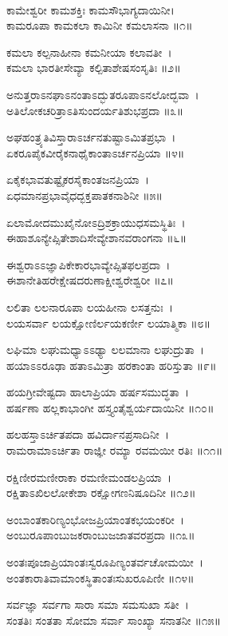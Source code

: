 \\
ಕಾಮೇಶ್ವರೀ ಕಾಮಶಕ್ತಿಃ ಕಾಮಸೌಭಾಗ್ಯದಾಯಿನೀ।\\
ಕಾಮರೂಪಾ ಕಾಮಕಲಾ ಕಾಮಿನೀ ಕಮಲಾಸನಾ ॥೧॥

ಕಮಲಾ ಕಲ್ಪನಾಹೀನಾ ಕಮನೀಯಾ ಕಲಾವತೀ~।\\
ಕಮಲಾ ಭಾರತೀಸೇವ್ಯಾ ಕಲ್ಪಿತಾಶೇಷಸಂಸೃತಿಃ ॥೨॥

ಅನುತ್ತರಾಽನಘಾಽನಂತಾಽದ್ಭುತರೂಪಾಽನಲೋದ್ಭವಾ~।\\
ಅತಿಲೋಕಚರಿತ್ರಾಽತಿಸುಂದರ್ಯತಿಶುಭಪ್ರದಾ ॥೩॥

ಅಘಹಂತ್ರ್ಯತಿವಿಸ್ತಾರಾಽರ್ಚನತುಷ್ಟಾಽಮಿತಪ್ರಭಾ~।\\
ಏಕರೂಪೈಕವೀರೈಕನಾಥೈಕಾಂತಾಽರ್ಚನಪ್ರಿಯಾ ॥೪॥

ಏಕೈಕಭಾವತುಷ್ಟೈಕರಸೈಕಾಂತಜನಪ್ರಿಯಾ~।\\
ಏಧಮಾನಪ್ರಭಾವೈಧದ್ಭಕ್ತಪಾತಕನಾಶಿನೀ ॥೫॥

ಏಲಾಮೋದಮುಖೈನೋಽದ್ರಿಶಕ್ರಾಯುಧಸಮಸ್ಥಿತಿಃ~।\\
ಈಹಾಶೂನ್ಯೇಪ್ಸಿತೇಶಾದಿಸೇವ್ಯೇಶಾನವರಾಂಗನಾ ॥೬॥

ಈಶ್ವರಾಽಽಜ್ಞಾಪಿಕೇಕಾರಭಾವ್ಯೇಪ್ಸಿತಫಲಪ್ರದಾ~।\\
ಈಶಾನೇತಿಹರೇಕ್ಷೇಷದರುಣಾಕ್ಷೀಶ್ವರೇಶ್ವರೀ ॥೭॥

ಲಲಿತಾ ಲಲನಾರೂಪಾ ಲಯಹೀನಾ ಲಸತ್ತನುಃ~।\\
ಲಯಸರ್ವಾ ಲಯಕ್ಷೋಣಿರ್ಲಯಕರ್ಣೀ ಲಯಾತ್ಮಿಕಾ ॥೮॥

ಲಘಿಮಾ ಲಘುಮಧ್ಯಾಽಽಢ್ಯಾ ಲಲಮಾನಾ ಲಘುದ್ರುತಾ~।\\
ಹಯಾಽಽರೂಢಾ ಹತಾಽಮಿತ್ರಾ ಹರಕಾಂತಾ ಹರಿಸ್ತುತಾ ॥೯॥

ಹಯಗ್ರೀವೇಷ್ಟದಾ ಹಾಲಾಪ್ರಿಯಾ ಹರ್ಷಸಮುದ್ಧತಾ~।\\
ಹರ್ಷಣಾ ಹಲ್ಲಕಾಭಾಂಗೀ ಹಸ್ತ್ಯಂತೈಶ್ವರ್ಯದಾಯಿನೀ ॥೧೦॥

ಹಲಹಸ್ತಾಽರ್ಚಿತಪದಾ ಹವಿರ್ದಾನಪ್ರಸಾದಿನೀ~।\\
ರಾಮರಾಮಾಽರ್ಚಿತಾ ರಾಜ್ಞೀ ರಮ್ಯಾ ರವಮಯೀ ರತಿಃ ॥೧೧॥

ರಕ್ಷಿಣೀರಮಣೀರಾಕಾ ರಮಣೀಮಂಡಲಪ್ರಿಯಾ~।\\
ರಕ್ಷಿತಾಽಖಿಲಲೋಕೇಶಾ ರಕ್ಷೋಗಣನಿಷೂದಿನೀ ॥೧೨॥

ಅಂಬಾಂತಕಾರಿಣ್ಯಂಭೋಜಪ್ರಿಯಾಂತಕಭಯಂಕರೀ~।\\
ಅಂಬುರೂಪಾಂಬುಜಕರಾಂಬುಜಜಾತವರಪ್ರದಾ ॥೧೩॥

ಅಂತಃಪೂಜಾಪ್ರಿಯಾಂತಃಸ್ವರೂಪಿಣ್ಯಂತರ್ವಚೋಮಯೀ~।\\
ಅಂತಕಾರಾತಿವಾಮಾಂಕಸ್ಥಿತಾಂತಃಸುಖರೂಪಿಣೀ ॥೧೪॥

ಸರ್ವಜ್ಞಾ ಸರ್ವಗಾ ಸಾರಾ ಸಮಾ ಸಮಸುಖಾ ಸತೀ~।\\
ಸಂತತಿಃ ಸಂತತಾ ಸೋಮಾ ಸರ್ವಾ ಸಾಂಖ್ಯಾ ಸನಾತನೀ ॥೧೫॥
